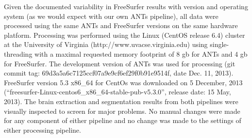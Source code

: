 Given the documented variability in FreeSurfer results with version and
operating system \citep{gronenschild2012} (as we would expect with our own ANTs pipeline),
all data were processed using the same ANTs and FreeSurfer versions on the same 
hardware platform.  Processing was performed using the Linux (CentOS release 6.4) 
cluster at the University 
of Virginia (http://www.uvacse.virginia.edu)
using single-threading with a maximal requested memory footprint of 8 gb for ANTs 
and 4 gb for FreeSurfer.  The development version of ANTs was used for processing 
(git commit tag: 69d3a5a6c7125ccf07a9e9cf6ef29f0b91e9514f, date Dec. 11, 2013).  
FreeSurfer version 5.3 x86\_64 for CentOs was downloaded 
on 5 December, 2013 (``freesurfer-Linux-centos6\_x86\_64-stable-pub-v5.3.0'', release
date: 15 May, 2013).   The brain extraction and segmentation results from both 
pipelines were visually inspected to screen for major problems.
No manual changes were made for any component of either pipeline and no change was made to the settings of either processing pipeline.



